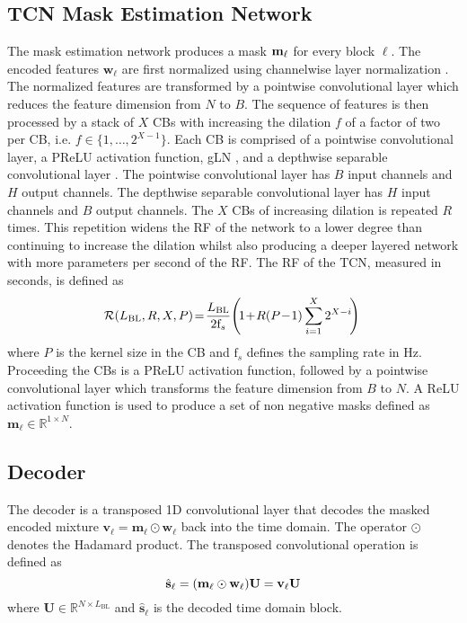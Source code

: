 \documentclass[conference,a4paper]{IEEEtran}
\newcommand{\mat}[1]{\mathbf{#1}}
\newcommand{\Real}{\mathbb{R}}
\begin{document}
\subsection{\texorpdfstring{\Ac{TCN} Mask Estimation Network}{TCN Mask Estimation}}
The mask estimation network produces a {mask} $\boldsymbol{\mathrm{m}}_\ell$ for {every block $\ell$.} The encoded features {$\mat{w}_\ell$} are first normalized using channelwise layer normalization \cite{ba2016layer}. The normalized features are transformed by a pointwise convolutional layer \cite{convtasnet} which reduces the feature dimension from $N$ to $B$. 
The sequence of features is then processed by a stack of $X$ \acp{CB} with increasing the dilation $f$ of a factor of two per \ac{CB}, i.e. $f\in\{1,\ldots,2^{X-1}\}$. Each \ac{CB} is comprised of a pointwise convolutional 
{layer}, a \ac{PReLU} activation function, \ac{gLN} \cite{convtasnet}, and a depthwise separable convolutional layer \cite{convtasnet}.
The pointwise convolutional layer has $B$ input channels and $H$ output channels. The depthwise separable convolutional layer has $H$ input channels and $B$ output channels. 
The $X$ \acp{CB} of increasing dilation is repeated $R$ times. This {repetition} widens the \ac{RF} of the network to a {lower} degree than continuing to increase the dilation whilst also producing a deeper layered network with more parameters per second of the \ac{RF}. The \ac{RF} of the \ac{TCN}, measured in seconds, is defined as
\begin{equation}
    \label{eq:temporalcontext}
    \hspace*{-0.8ex}\mathcal{R}(L_{\mathrm{BL}},R,X,P)\!=\!
\frac{L_{\mathrm{BL}}}{2\mathrm{f}_s}
    \!\left(\!1\!+\!{R}(P\!-\!1)\sum_{i=1}^{X}2^{X-i}\!\right)\!
\end{equation}
where $P$ is the kernel size in the \ac{CB} and $\mathrm{f}_s$ defines the sampling rate in Hz.
Proceeding the \acp{CB} is a \ac{PReLU} activation function, followed by a pointwise convolutional layer which transforms the feature dimension from $B$ to $N$. A ReLU activation function is used to produce a set of non negative masks
defined as $\mat{m}_{\ell}\in \Real^{1\times N}$.
\subsection{Decoder}
The decoder is a transposed 1D convolutional layer that decodes the masked encoded mixture ${\mat{v}_{\ell}=\mat{m}_{\ell}\odot\mat{w}_\ell}$ back into the time domain. {The operator $\odot$ denotes the Hadamard product.} The transposed convolutional operation is defined as
\begin{equation}
 \hat{\vekt{s}}_{\ell}=(\mat{m}_{\ell}\odot\mat{w}_\ell)\mat{U}=\mat{v}_{\ell}\mat{U}
\end{equation}
where $\mat{U}\in \Real^{N\times L_{\mathrm{BL}}}$ and $\hat{\mat{s}}_{\ell}$ is the decoded time domain block.
\end{document}

